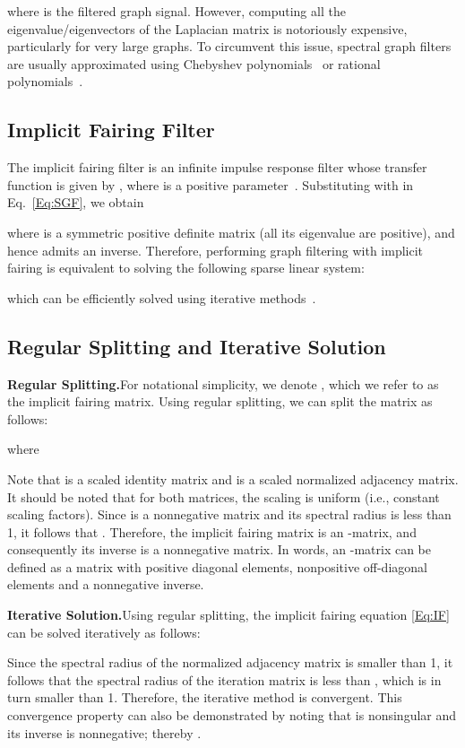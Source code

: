 \documentclass[10pt,journal]{IEEEtran}
\begin{document}
where  is the filtered graph signal. However, computing all the eigenvalue/eigenvectors of the Laplacian matrix is notoriously expensive, particularly for very large graphs. To circumvent this issue, spectral graph filters are usually approximated using Chebyshev polynomials~\cite{Taubin:96,Hammond:11,defferrard2016convolutional} or rational polynomials~\cite{Levie:18,Bianchi:22,Wijesinghe:19}.
	
\subsection{Implicit Fairing Filter}
The implicit fairing filter is an infinite impulse response filter whose transfer function is given by , where  is a positive parameter~\cite{Desbrun:99,quan2021higher}. Substituting  with  in Eq.~\eqref{Eq:SGF}, we obtain

where  is a symmetric positive definite matrix (all its eigenvalue are positive), and hence admits an inverse. Therefore, performing graph filtering with implicit fairing is equivalent to solving the following sparse linear system:

which can be efficiently solved using iterative methods~\cite{Saad:03}.	

\subsection{Regular Splitting and Iterative Solution}
\noindent\textbf{Regular Splitting.}\quad For notational simplicity, we denote , which we refer to as the implicit fairing matrix. Using regular splitting, we can split the matrix  as follows:

where

Note that  is a scaled identity matrix and  is a scaled normalized adjacency matrix. It should be noted that for both matrices, the scaling is uniform (i.e., constant scaling factors). Since  is a nonnegative matrix and its spectral radius is less than 1, it follows that . Therefore, the implicit fairing matrix  is an -matrix, and consequently its inverse is a nonnegative matrix. In words, an -matrix can be defined as a matrix with positive diagonal elements, nonpositive off-diagonal elements and a nonnegative inverse.

\medskip\noindent\textbf{Iterative Solution.}\quad Using regular splitting, the implicit fairing equation \eqref{Eq:IF} can be solved iteratively as follows:

Since the spectral radius of the normalized adjacency matrix  is smaller than 1, it follows that the spectral radius of the iteration matrix  is less than , which is in turn smaller than 1. Therefore, the iterative method is convergent. This convergence property can also be demonstrated by noting that  is nonsingular and its inverse is nonnegative; thereby .
\end{document}
